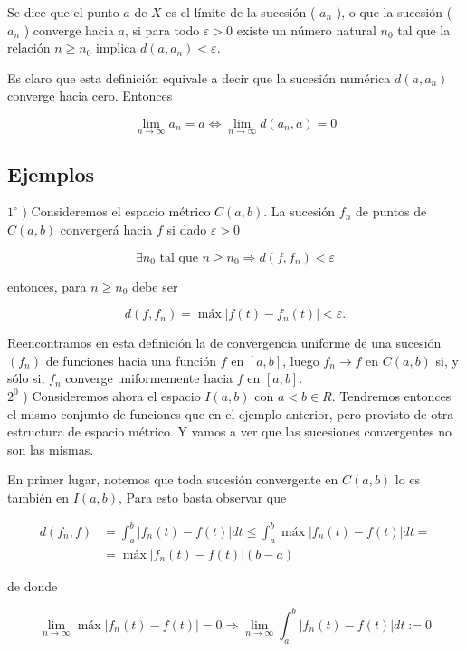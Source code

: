 \documentclass[10pt]{article}
\theoremstyle{plain}
\theoremstyle{definition}
\theoremstyle{remark}
\begin{document}
Se dice que el punto $a$ de $X$ es el límite de la sucesión ( $a_{n}$ ), o que la sucesión ( $a_{n}$ ) converge hacia $a$, si para todo $\varepsilon>0$ existe un número natural $n_{0}$ tal que la relación $n \geqslant n_{0}$ implica $d\left(a, a_{n}\right)<\varepsilon$.

Es claro que esta definición equivale a decir que la sucesión numérica $d\left(a, a_{n}\right)$ converge hacia cero. Entonces

$$
\lim _{n \rightarrow \infty} a_{n}=a \Longleftrightarrow \lim _{n \rightarrow \infty} d\left(a_{n}, a\right)=0
$$

\subsection*{Ejemplos}
$1^{\circ}$ ) Consideremos el espacio métrico $C(a, b)$. La sucesión $f_{n}$ de puntos de $C(a, b)$ convergerá hacia $f$ si dado $\varepsilon>0$

$$
\exists n_{0} \text { tal que } n \geqslant n_{0} \Rightarrow d\left(f, f_{n}\right)<\varepsilon
$$

entonces, para $n \geqslant n_{0}$ debe ser

$$
d\left(f, f_{n}\right)=\operatorname{máx}\left|f(t)-f_{n}(t)\right|<\varepsilon .
$$

Reencontramos en esta definición la de convergencia uniforme de una sucesión $\left(f_{n}\right)$ de funciones hacia una función $f$ en $[a, b]$, luego $f_{n} \rightarrow f$ en $C(a, b)$ si, y sólo si, $f_{n}$ converge uniformemente hacia $f$ en $[a, b]$.\\
$2^{0}$ ) Consideremos ahora el espacio $I(a, b)$ con $a<b \in R$. Tendremos entonces el mismo conjunto de funciones que en el ejemplo anterior, pero provisto de otra estructura de espacio métrico. Y vamos a ver que las sucesiones convergentes no son las mismas.

En primer lugar, notemos que toda sucesión convergente en $C(a, b)$ lo es también en $I(a, b)$, Para esto basta observar que

$$
\begin{aligned}
d\left(f_{n}, f\right) & =\int_{a}^{b}\left|f_{n}(t)-f(t)\right| d t \leqslant \int_{a}^{b} \operatorname{máx}\left|f_{n}(t)-f(t)\right| d t= \\
& =\operatorname{máx}\left|f_{n}(t)-f(t)\right|(b-a)
\end{aligned}
$$

de donde

$$
\lim _{n \rightarrow \infty} \operatorname{máx}\left|f_{n}(t)-f(t)\right|=0 \Rightarrow \lim _{n \rightarrow \infty} \int_{a}^{b}\left|f_{n}(t)-f(t)\right| d t:=0
$$
\end{document}
